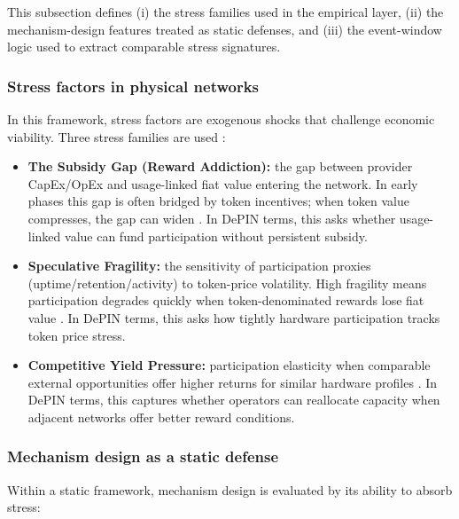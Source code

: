 This subsection defines (i) the stress families used in the empirical layer, (ii) the mechanism-design features treated as static defenses, and (iii) the event-window logic used to extract comparable stress signatures.

\subsubsection{Stress factors in physical networks}
In this framework, stress factors are exogenous shocks that challenge economic viability. Three stress families are used \cite{Lin2024, Ho2022}:

\begin{itemize}
    \item \textbf{The Subsidy Gap (Reward Addiction):} the gap between provider CapEx/OpEx and usage-linked fiat value entering the network. In early phases this gap is often bridged by token incentives; when token value compresses, the gap can widen \cite{Lin2024, McConaghy2020}. In DePIN terms, this asks whether usage-linked value can fund participation without persistent subsidy.
    \item \textbf{Speculative Fragility:} the sensitivity of participation proxies (uptime/retention/activity) to token-price volatility. High fragility means participation degrades quickly when token-denominated rewards lose fiat value \cite{Ho2022}. In DePIN terms, this asks how tightly hardware participation tracks token price stress.
    \item \textbf{Competitive Yield Pressure:} participation elasticity when comparable external opportunities offer higher returns for similar hardware profiles \cite{Lin2024, Chiu2024}. In DePIN terms, this captures whether operators can reallocate capacity when adjacent networks offer better reward conditions.
\end{itemize}

\subsubsection{Mechanism design as a static defense}
Within a static framework, mechanism design is evaluated by its ability to absorb stress:

